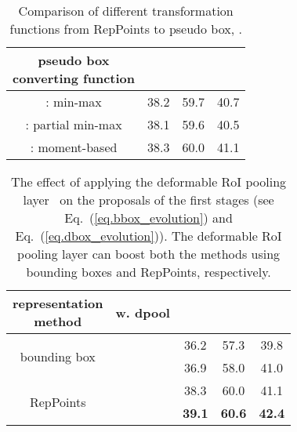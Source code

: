 \documentclass[10pt,twocolumn,letterpaper]{article}
\begin{document}
\begin{table}[tb]
	\begin{center}
	\begin{tabular}{c|c|c|c}
	\hline
	\makecell{pseudo box\\converting function} &  &  &  \\
	\hline
	    : min-max & 38.2 & 59.7 & 40.7 \\
 	\hline
 		: partial min-max & 38.1 & 59.6 & 40.5 \\
 	\hline
 		: moment-based & 38.3 & 60.0 & 41.1 \\
 	\hline
	\end{tabular}
	\end{center}
\caption{Comparison of different transformation functions from RepPoints to pseudo box, .}
\label{tab::function}
\end{table} \begin{table}[tb]
	\begin{center}
	\begin{tabular}{c|c|c|c|c}
	\hline
	\makecell{representation\\method} & w. dpool &  &  &  \\
	\hline
	\hline
	\multirow{2}{*}{bounding box} & & 36.2 & 57.3 & 39.8 \\
	\cline{2-5}
 	 & \checkmark & 36.9 & 58.0 & 41.0 \\
	\hline
	\multirow{2}{*}{RepPoints} & & 38.3 & 60.0 & 41.1 \\
	\cline{2-5}
	 & \checkmark & \textbf{39.1} & \textbf{60.6} & \textbf{42.4} \\
	\hline
    \end{tabular}
	\end{center}
\caption{The effect of applying the deformable RoI pooling layer~\cite{DCN} on the proposals of the first stages (see Eq.~(\ref{eq.bbox_evolution}) and Eq.~(\ref{eq.dbox_evolution})). The deformable RoI pooling layer can boost both the methods using bounding boxes and RepPoints, respectively.}
\label{tab::dpool}
\end{table}
\end{document}
